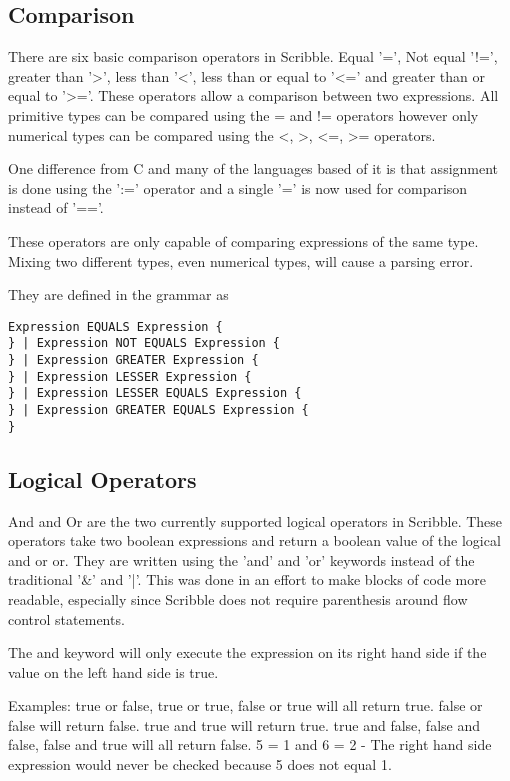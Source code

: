 \documentclass[]{final_report}
\begin{document}
\subsection{Comparison}

There are six basic comparison operators in Scribble. Equal '=', Not equal '!=', greater than '>', less than '<', less than or equal to '<=' and greater than or equal to '>='. These operators allow a comparison between two expressions. All primitive types can be compared using the = and != operators however only numerical types can be compared using the <, >, <=, >= operators.

One difference from C and many of the languages based of it is that assignment is done using the ':=' operator and a single '=' is now used for comparison instead of '=='.

These operators are only capable of comparing expressions of the same type. Mixing two different types, even numerical types, will cause a parsing error.

They are defined in the grammar as \begin{verbatim}
Expression EQUALS Expression {
} | Expression NOT EQUALS Expression {
} | Expression GREATER Expression {
} | Expression LESSER Expression {
} | Expression LESSER EQUALS Expression {
} | Expression GREATER EQUALS Expression {
}
\end{verbatim}

\subsection{Logical Operators}

And and Or are the two currently supported logical operators in Scribble. These operators take two boolean expressions and return a boolean value of the logical and or or. They are written using the 'and' and 'or' keywords instead of the traditional '\&' and '|'. This was done in an effort to make blocks of code more readable, especially since Scribble does not require parenthesis around flow control statements.

The and keyword will only execute the expression on its right hand side if the value on the left hand side is true.

Examples:
true or false, true or true, false or true will all return true.
false or false will return false.
true and true will return true.
true and false, false and false, false and true will all return false.
5 = 1 and 6 = 2 - The right hand side expression would never be checked because 5 does not equal 1.
\end{document}
